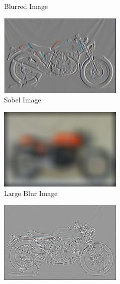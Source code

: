 \documentclass{bmvc2k}
\begin{document}
\begin{figure}[h!]
\begin{subfigure}[b]{0.3\linewidth}
    \caption{Blurred Image}
  \end{subfigure}
  \begin{subfigure}[b]{0.3\linewidth}
    \includegraphics[width=\linewidth]{images/sobel_image.jpg}
    \caption{Sobel Image}
  \end{subfigure}
  \begin{subfigure}[b]{0.3\linewidth}
    \includegraphics[width=\linewidth]{images/large_blur_image.jpg}
    \caption{Large Blur Image}
  \end{subfigure}
  \begin{subfigure}[b]{0.3\linewidth}
    \includegraphics[width=\linewidth]{images/laplacian_image.jpg}

\end{subfigure}
\end{figure}
\end{document}

